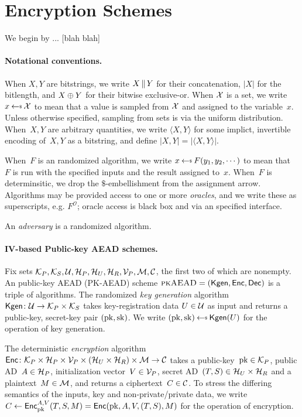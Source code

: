 \section{Encryption Schemes}
\label{sec:prelims}
\label{sec:encryption}
We begin by ... [blah blah]

\paragraph{Notational conventions. }When $X,Y$ are bitstrings, we write $X \,\|\, Y$ for their concatenation, $|X|$ for the bitlength, and $X\oplus Y$ for their bitwise exclusive-or.  When $\mathcal{X}$ is a set, we write $x \getsr \calX$ to mean that a value is sampled from $\mathcal{X}$ and assigned to the variable~$x$.  Unless otherwise specified, sampling from sets is via the uniform distribution.  When~$X,Y$ are arbitrary quantities, we write $\langle X,Y \rangle$ for some implict, invertible encoding of~$X,Y$ as a bitstring, and define $|X,Y|=|\langle X,Y\rangle|$.

When~$F$ is an randomized algorithm, we write $x \getsr F(y_1,y_2,\cdots)$ to mean that~$F$ is run with the specified inputs and the result assigned to~$x$.  When~$F$ is determinsitic, we drop the $\$$-embellishment from the assignment arrow.  Algorithms may be provided access to one or more \emph{oracles}, and we write these as superscripts, e.g. $F^{\mathcal{O}}$; oracle access is black box and via an specified interface.  

An \emph{adversary} is a randomized algorithm.

\paragraph{IV-based Public-key AEAD schemes. }
Fix sets $\mathcal{K}_P, \mathcal{K}_S, \mathcal{U}, \mathcal{H}_P, \mathcal{H}_U, \mathcal{H}_R, \mathcal{V}_P, \mathcal{M},
\mathcal{C}$, the first two of which are nonempty.  An public-key AEAD
(PK-AEAD) scheme $\textsc{pkAEAD}=(\mathsf{Kgen},{\mathsf{Enc}},{\mathsf{Dec}})$ is a triple of algorithms.  The randomized \emph{key generation} algorithm~$\mathsf{Kgen}\colon\mathcal{U}\to\mathcal{K}_P\times\mathcal{K}_S$ takes key-registration data $U \in \mathcal{U}$ as input and returns a public-key, secret-key pair $(\mathrm{pk},\mathrm{sk})$.  We write $(\pk,\sk)\getsr\Kgen(\kreg)$ for the operation of key generation. 

The deterministic \emph{encryption} algorithm ${\mathsf{Enc}} \colon \mathcal{K}_P \times \mathcal{H}_P \times \mathcal{V}_P \times \left(\mathcal{H}_U \times \mathcal{H}_R\right) \times \mathcal{M} \to \mathcal{C}$ takes a public-key~$\mathrm{pk}\in\mathcal{K}_P$, public AD~$A \in \mathcal{H}_P$, initialization vector~$V \in \mathcal{V}_P$, secret AD~$(T,S) \in \mathcal{H}_U \times \mathcal{H}_R$ and a plaintext~$M \in \mathcal{M}$, and returns a ciphertext~$C \in \mathcal{C}$. 
To stress the differing semantics of the inputs, key and non-private/private data, we write $C\gets{\mathsf{Enc}}_{\mathrm{pk}}^{A,V}(T,S,M) ={\mathsf{Enc}}(\mathrm{pk},A,V,(T,S),M)$ for the operation of encryption.  %


